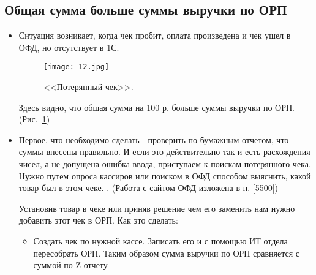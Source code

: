 \subsection{Общая сумма больше суммы выручки по ОРП}

\begin{itemize}	
	\item Ситуация возникает, когда чек пробит, оплата произведена и чек ушел в ОФД, но отсутствует в 1С.

	
	\begin{figure}[H]
		\texttt{[image: 12.jpg]}
		\caption{<<Потерянный чек>>.}
		\label{ris:12.jpg}
	\end{figure}
	Здесь видно, что общая сумма  на 100 р. больше суммы выручки по ОРП.  (Рис.~\ref{ris:12.jpg})
	\item Первое, что  необходимо сделать - проверить по бумажным отчетом, что суммы внесены правильно. И если это действительно так и есть расхождения чисел, а не допущена ошибка ввода, приступаем к поискам потерянного чека.
	Нужно путем опроса кассиров или поиском в ОФД способом выяснить, какой товар был в этом чеке. . (Работа с сайтом ОФД изложена в п. \ref{5500})
	
	
	Установив товар в чеке или приняв решение чем его заменить нам нужно добавить этот чек в ОРП. Как  это сделать:
	
	\begin{itemize}
		\item Создать чек по нужной кассе. Записать его и с помощью ИТ отдела пересобрать ОРП.
		      Таким образом сумма выручки по ОРП сравняется с суммой по Z-отчету
	\end{itemize}
	
	
	
\end{itemize}
